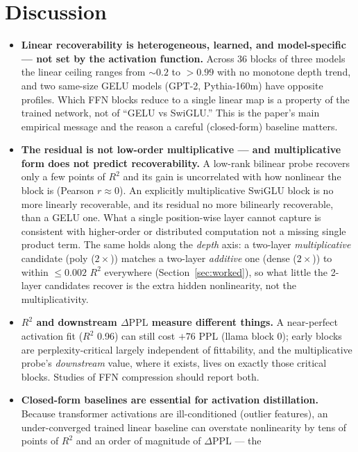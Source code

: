 \documentclass{article}
\newcommand{\dppl}{\Delta\mathrm{PPL}}
\begin{document}
\section{Discussion}
\label{sec:discussion}

\begin{itemize}
\item \textbf{Linear recoverability is heterogeneous, learned, and model-specific --- not set by
  the activation function.} Across 36 blocks of three models the linear ceiling ranges from
  ${\sim}0.2$ to $>0.99$ with no monotone depth trend, and two same-size GELU models (GPT-2,
  Pythia-160m) have opposite profiles. Which FFN blocks reduce to a single linear map is a property
  of the trained network, not of ``GELU vs SwiGLU.'' This is the paper's main empirical message and
  the reason a careful (closed-form) baseline matters.
\item \textbf{The residual is not low-order multiplicative --- and multiplicative form does not
  predict recoverability.} A low-rank bilinear probe recovers only a few points of $R^2$ and its
  gain is uncorrelated with how nonlinear the block is (Pearson $r\approx 0$). An explicitly
  multiplicative SwiGLU block is no more linearly recoverable, and its residual no more bilinearly
  recoverable, than a GELU one. What a single position-wise layer cannot capture is consistent with
  higher-order or distributed computation not a missing single product term. The same holds
  along the \emph{depth} axis:
  a two-layer \emph{multiplicative} candidate (poly ($2\times$)) matches a two-layer \emph{additive}
  one (dense ($2\times$)) to within $\le 0.002$ $R^2$ everywhere (Section~\ref{sec:worked}), so what
  little the 2-layer candidates recover is the extra hidden nonlinearity, not the multiplicativity.
\item \textbf{$R^2$ and downstream $\dppl$ measure different things.} A near-perfect activation fit
  ($R^2$ 0.96) can still cost $+76$ PPL (llama block 0); early blocks are perplexity-critical largely
  independent of fittability, and the multiplicative probe's \emph{downstream} value, where it
  exists, lives on exactly those critical blocks. Studies of FFN compression should report both.
\item \textbf{Closed-form baselines are essential for activation distillation.} Because transformer
  activations are ill-conditioned (outlier features), an under-converged trained linear baseline can
  overstate nonlinearity by tens of points of $R^2$ and an order of magnitude of $\dppl$ --- the

\end{itemize}
\end{document}
